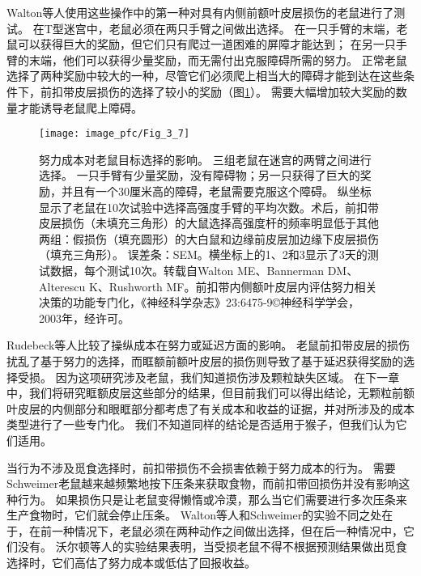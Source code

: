 Walton等人\cite{walton2003functional}使用这些操作中的第一种对具有内侧前额叶皮层损伤的老鼠进行了测试。
在T型迷宫中，老鼠必须在两只手臂之间做出选择。
在一只手臂的末端，老鼠可以获得巨大的奖励，但它们只有爬过一道困难的屏障才能达到；
在另一只手臂的末端，他们可以获得少量奖励，而无需付出克服障碍所需的努力。
正常老鼠选择了两种奖励中较大的一种，尽管它们必须爬上相当大的障碍才能到达在这些条件下，前扣带皮层损伤的选择了较小的奖励（图\ref{fig:3_7}）。
需要大幅增加较大奖励的数量才能诱导老鼠爬上障碍\cite{walton2002role}。\par


\begin{figure}[!htb]
	\centering
	\texttt{[image: image\_pfc/Fig\_3\_7]}
	\caption{努力成本对老鼠目标选择的影响。
		三组老鼠在迷宫的两臂之间进行选择。
		一只手臂有少量奖励，没有障碍物；另一只获得了巨大的奖励，并且有一个30厘米高的障碍，老鼠需要克服这个障碍。
		纵坐标显示了老鼠在10次试验中选择高强度手臂的平均次数。术后，前扣带皮层损伤（未填充三角形）的大鼠选择高强度杆的频率明显低于其他两组：假损伤（填充圆形）的大白鼠和边缘前皮层加边缘下皮层损伤（填充三角形）。
		误差条：SEM。横坐标上的1、2和3显示了3天的测试数据，每个测试10次。转载自Walton ME、Bannerman DM、Alterescu K、Rushworth MF。前扣带内侧额叶皮层内评估努力相关决策的功能专门化，《神经科学杂志》23:6475-9©神经科学学会，2003年，经许可。}
	\label{fig:3_7}
\end{figure}


Rudebeck等人\cite{rudebeck2006separate}比较了操纵成本在努力或延迟方面的影响。
老鼠前扣带皮层的损伤扰乱了基于努力的选择，而眶额前额叶皮层的损伤则导致了基于延迟获得奖励的选择受损。
因为这项研究涉及老鼠，我们知道损伤涉及颗粒缺失区域。
在下一章中，我们将研究眶额皮层这些部分的结果，但目前我们可以得出结论，无颗粒前额叶皮层的内侧部分和眼眶部分都考虑了有关成本和收益的证据，并对所涉及的成本类型进行了一些专门化。
我们不知道同样的结论是否适用于猴子，但我们认为它们适用。\par


当行为不涉及觅食选择时，前扣带损伤不会损害依赖于努力成本的行为。
需要Schweimer\cite{schweimer2005involvement}老鼠越来越频繁地按下压条来获取食物，而前扣带回损伤并没有影响这种行为。
如果损伤只是让老鼠变得懒惰或冷漠，那么当它们需要进行多次压条来生产食物时，它们就会停止压条。
Walton等人\cite{walton2002role}和Schweimer\cite{schweimer2005involvement}的实验不同之处在于，在前一种情况下，老鼠必须在两种动作之间做出选择，但在后一种情况中，它们没有。
沃尔顿等人的实验结果表明，当受损老鼠不得不根据预测结果做出觅食选择时，它们高估了努力成本或低估了回报收益。\par



